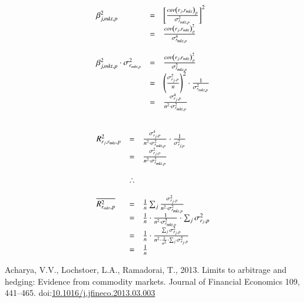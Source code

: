 \documentclass[]{elsarticle} %
\begin{document}
\[\begin{array}{l c l}
  \beta_{j, mkt, p}^{2} & = & \left [ \frac{cov \left ( r_{j}, r_{mkt} \right )_{p}}{\sigma_{r_{mkt, p}}^{2}} \right ]^{2} \\
                        & = & \frac{cov \left ( r_{j}, r_{mkt} \right )_{p}^{2}}{\sigma_{r_{mkt, p}}^{4}} \\ \\
  \beta_{j, mkt, p}^{2} \cdot  \sigma_{r_{mkt, p}}^{2}  & = & \frac{cov \left ( r_{j}, r_{mkt} \right )_{p}^{2}}{\sigma_{r_{mkt, p}}^{2}} \\
                                                        & = & \left ( \frac{\sigma_{r_{j}, p}^{2}}{n} \right )^{2} \cdot \frac{1}{\sigma_{r_{mkt, p}}^{2}} \\
                                                        & = & \frac{\sigma_{r_{j}, p}^{4}}{n^{2} \cdot \sigma_{r_{mkt, p}}^{2}} \\ \\
\end{array}
\]

\newpage

\[
\begin{array}{l c l}
  R_{r_{j}, r_{mkt}, p}^{2} & = & \frac{\sigma_{r_{j}, p}^{4}}{n^{2} \cdot \sigma_{r_{mkt, p}}^{2}} \cdot \frac{1}{\sigma_{r_{j, p}}^{2}} \\
                            & = & \frac{\sigma_{r_{j}, p}^{2}}{n^{2} \cdot \sigma_{r_{mkt, p}}^{2}} \\ \\  
                            & \therefore  & \\ \\
  \overline{R_{r_{mkt}, p}^{2}} & = & \frac{1}{n} \sum_{j} \frac{\sigma_{r_{j}, p}^{2}}{n^{2} \cdot \sigma_{r_{mkt, p}}^{2}} \\
                                & = & \frac{1}{n} \cdot \frac{1}{n^{2} \cdot \sigma_{r_{mkt, p}}^{2}} \cdot \sum_{j} \sigma_{r_{j}, p}^{2} \\
                                & = & \frac{1}{n} \cdot \frac{\sum_{j} \sigma_{r_{j}, p}^{2}}{n^{2} \cdot \frac{1}{n^{2}} \cdot \sum_{j} \sigma_{r_{j}, p}^{2}} \\
                                & = & \frac{1}{n} \\
\end{array}
\]

\newpage

\hypertarget{refs}{}
\leavevmode\hypertarget{ref-acharya_limits_2013}{}%
Acharya, V.V., Lochstoer, L.A., Ramadorai, T., 2013. Limits to arbitrage
and hedging: Evidence from commodity markets. Journal of Financial
Economics 109, 441--465.
doi:\href{https://doi.org/10.1016/j.jfineco.2013.03.003}{10.1016/j.jfineco.2013.03.003}
\end{document}
